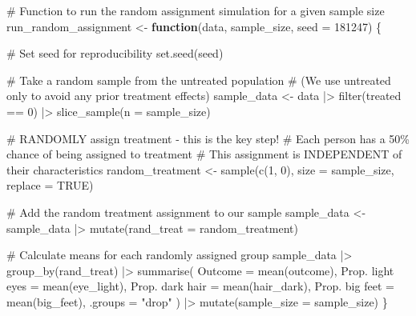 \documentclass[
  letterpaper,
  DIV=11,
  numbers=noendperiod]{scrreprt}
\newenvironment{Shaded}{\begin{snugshade}}{\end{snugshade}}
\newcommand{\AttributeTok}[1]{\textcolor[rgb]{0.40,0.45,0.13}{#1}}
\newcommand{\CommentTok}[1]{\textcolor[rgb]{0.37,0.37,0.37}{#1}}
\newcommand{\ConstantTok}[1]{\textcolor[rgb]{0.56,0.35,0.01}{#1}}
\newcommand{\ControlFlowTok}[1]{\textcolor[rgb]{0.00,0.23,0.31}{\textbf{#1}}}
\newcommand{\DecValTok}[1]{\textcolor[rgb]{0.68,0.00,0.00}{#1}}
\newcommand{\FunctionTok}[1]{\textcolor[rgb]{0.28,0.35,0.67}{#1}}
\newcommand{\NormalTok}[1]{\textcolor[rgb]{0.00,0.23,0.31}{#1}}
\newcommand{\OtherTok}[1]{\textcolor[rgb]{0.00,0.23,0.31}{#1}}
\newcommand{\SpecialCharTok}[1]{\textcolor[rgb]{0.37,0.37,0.37}{#1}}
\newcommand{\StringTok}[1]{\textcolor[rgb]{0.13,0.47,0.30}{#1}}
\begin{document}
\begin{Shaded}
\begin{Highlighting}[]
\CommentTok{\# Function to run the random assignment simulation for a given sample size}
\NormalTok{run\_random\_assignment }\OtherTok{\textless{}{-}} \ControlFlowTok{function}\NormalTok{(data, sample\_size, }\AttributeTok{seed =} \DecValTok{181247}\NormalTok{) \{}
  
  \CommentTok{\# Set seed for reproducibility}
  \FunctionTok{set.seed}\NormalTok{(seed)}
  
  \CommentTok{\# Take a random sample from the untreated population}
  \CommentTok{\# (We use untreated only to avoid any prior treatment effects)}
\NormalTok{  sample\_data }\OtherTok{\textless{}{-}}\NormalTok{ data }\SpecialCharTok{|\textgreater{}}
    \FunctionTok{filter}\NormalTok{(treated }\SpecialCharTok{==} \DecValTok{0}\NormalTok{) }\SpecialCharTok{|\textgreater{}}
    \FunctionTok{slice\_sample}\NormalTok{(}\AttributeTok{n =}\NormalTok{ sample\_size)}
  
  \CommentTok{\# RANDOMLY assign treatment {-} this is the key step!}
  \CommentTok{\# Each person has a 50\% chance of being assigned to treatment}
  \CommentTok{\# This assignment is INDEPENDENT of their characteristics}
\NormalTok{  random\_treatment }\OtherTok{\textless{}{-}} \FunctionTok{sample}\NormalTok{(}\FunctionTok{c}\NormalTok{(}\DecValTok{1}\NormalTok{, }\DecValTok{0}\NormalTok{), }\AttributeTok{size =}\NormalTok{ sample\_size, }\AttributeTok{replace =} \ConstantTok{TRUE}\NormalTok{)}
  
  \CommentTok{\# Add the random treatment assignment to our sample}
\NormalTok{  sample\_data }\OtherTok{\textless{}{-}}\NormalTok{ sample\_data }\SpecialCharTok{|\textgreater{}}
    \FunctionTok{mutate}\NormalTok{(}\AttributeTok{rand\_treat =}\NormalTok{ random\_treatment)}
  
  \CommentTok{\# Calculate means for each randomly assigned group}
\NormalTok{  sample\_data }\SpecialCharTok{|\textgreater{}}
    \FunctionTok{group\_by}\NormalTok{(rand\_treat) }\SpecialCharTok{|\textgreater{}}
    \FunctionTok{summarise}\NormalTok{(}
      \AttributeTok{Outcome =} \FunctionTok{mean}\NormalTok{(outcome),}
      \StringTok{\textasciigrave{}}\AttributeTok{Prop. light eyes}\StringTok{\textasciigrave{}} \OtherTok{=} \FunctionTok{mean}\NormalTok{(eye\_light),}
      \StringTok{\textasciigrave{}}\AttributeTok{Prop. dark hair}\StringTok{\textasciigrave{}} \OtherTok{=} \FunctionTok{mean}\NormalTok{(hair\_dark),}
      \StringTok{\textasciigrave{}}\AttributeTok{Prop. big feet}\StringTok{\textasciigrave{}} \OtherTok{=} \FunctionTok{mean}\NormalTok{(big\_feet),}
      \AttributeTok{.groups =} \StringTok{"drop"}
\NormalTok{    ) }\SpecialCharTok{|\textgreater{}}
    \FunctionTok{mutate}\NormalTok{(}\AttributeTok{sample\_size =}\NormalTok{ sample\_size)}
\NormalTok{\}}


\end{Highlighting}
\end{Shaded}
\end{document}
